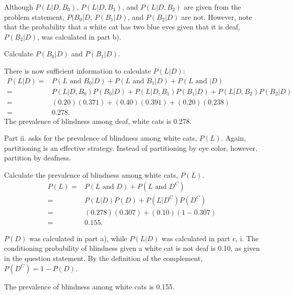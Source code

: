 Although $P(L|D, B_0)$, $P(L|D, B_1)$, and $P(L|D, B_2)$ are given from the problem statement, $P(B_0|D$, $P(B_1|D)$, and $P(B_2|D)$ are not. However, note that the probability that a white cat has two blue eyes given that it is deaf, $P(B_2|D)$, was calculated in part b). 

\begin{exercisewrap}
\begin{nexercise}
Calculate $P(B_0|D)$ and $P(B_1|D)$.\footnotemark{}
\end{nexercise}
\end{exercisewrap}
\footnotetext{\[P(B_0|D) = \dfrac{P(D \textrm{ and } B_0)}{P(D)} = \dfrac{P(D|B_0)P(B_0)}{P(D)} = \dfrac{(0.19)(0.60)}{0.307} = 0.371. \] \[P(B_1|D) = \dfrac{P(D \textrm{ and } B_1)}{P(D)} = \dfrac{P(D|B_1)P(B_1)}{P(D)} = \dfrac{(0.40)(0.30)}{0.307} = 0.391. \]}

There is now sufficient information to calculate $P(L|D)$: 
\begin{align*}
P(L|D) =& P(L \textrm{ and } B_0|D) + P(L \textrm{ and } B_1 | D) + P(L \textrm{ and } |D) \\
=& P(L|D, B_0)P(B_0|D) + P(L|D, B_1)P(B_1|D) + P(L|D, B_2)P(B_2|D) \\
=& (0.20)(0.371) + (0.40)(0.391) + (0.20)(0.238) \\
=& 0.278.
\end{align*}
The prevalence of blindness among deaf, white cats is 0.278.

Part ii. asks for the prevalence of blindness among white cats, $P(L)$. Again, partitioning is an effective strategy. Instead of partitioning by eye color, however, partition by deafness.

\textD{\newpage}

\begin{examplewrap}
\begin{nexample}{Calculate the prevalence of blindness among white cats, $P(L)$.}
\begin{align*}
P(L) =& P(L \textrm{ and } D) + P(L \textrm{ and } D^C) \\
=& P(L|D)P(D) + P(L|D^C)P(D^C) \\
=& (0.278)(0.307) + (0.10)(1 - 0.307) \\
=& 0.155.
\end{align*}	
	
$P(D)$ was calculated in part a), while $P(L|D)$ was calculated in part c, i. The conditioning probability of blindness given a white cat is not deaf is 0.10, as given in the question statement. By the definition of the complement, $P(D^C) = 1 - P(D)$. 

The prevalence of blindness among white cats is 0.155.
\end{nexample}
\end{examplewrap}

